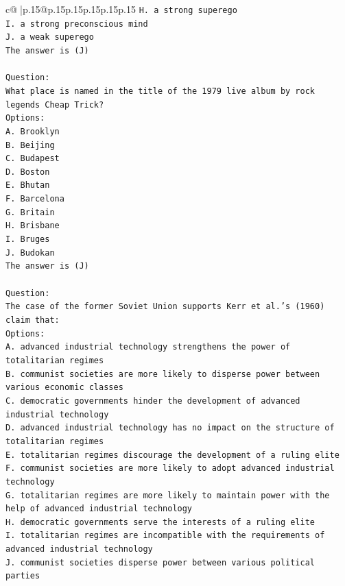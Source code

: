 \documentclass{article}
\begin{document}
{\begin{supertabular}{c@{$\;$}|p{.15\linewidth}@{}p{.15\linewidth}p{.15\linewidth}p{.15\linewidth}p{.15\linewidth}p{.15\linewidth}}
{{{\texttt{H. a strong superego} \\
\texttt{I. a strong preconscious mind} \\
\texttt{J. a weak superego} \\
\texttt{The answer is (J)} \\
\\ 
\texttt{Question:} \\
\texttt{What place is named in the title of the 1979 live album by rock legends Cheap Trick?} \\
\texttt{Options:} \\
\texttt{A. Brooklyn} \\
\texttt{B. Beijing} \\
\texttt{C. Budapest} \\
\texttt{D. Boston} \\
\texttt{E. Bhutan} \\
\texttt{F. Barcelona} \\
\texttt{G. Britain} \\
\texttt{H. Brisbane} \\
\texttt{I. Bruges} \\
\texttt{J. Budokan} \\
\texttt{The answer is (J)} \\
\\ 
\texttt{Question:} \\
\texttt{The case of the former Soviet Union supports Kerr et al.'s (1960) claim that:} \\
\texttt{Options:} \\
\texttt{A. advanced industrial technology strengthens the power of totalitarian regimes} \\
\texttt{B. communist societies are more likely to disperse power between various economic classes} \\
\texttt{C. democratic governments hinder the development of advanced industrial technology} \\
\texttt{D. advanced industrial technology has no impact on the structure of totalitarian regimes} \\
\texttt{E. totalitarian regimes discourage the development of a ruling elite} \\
\texttt{F. communist societies are more likely to adopt advanced industrial technology} \\
\texttt{G. totalitarian regimes are more likely to maintain power with the help of advanced industrial technology} \\
\texttt{H. democratic governments serve the interests of a ruling elite} \\
\texttt{I. totalitarian regimes are incompatible with the requirements of advanced industrial technology} \\
\texttt{J. communist societies disperse power between various political parties} \\
            }
        }
    }
     \\ \\


\end{supertabular}}
\end{document}
